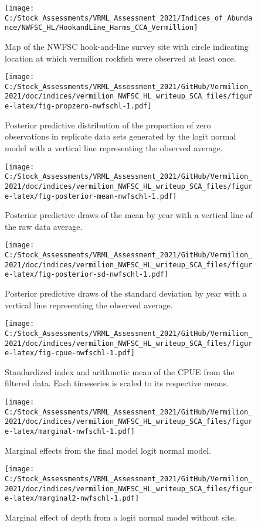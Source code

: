 \documentclass[
]{article}
\begin{document}
\FloatBarrier

\begin{figure}
\texttt{[image: C:/Stock\_Assessments/VRML\_Assessment\_2021/Indices\_of\_Abundance/NWFSC\_HL/HookandLine\_Harms\_CCA\_Vermillion]} \caption{Map of the NWFSC hook-and-line survey site with circle indicating location at which vermilion rockfish were observed at least once.}\label{fig:spp-sites}
\end{figure}

\begin{figure}
\centering
\texttt{[image: C:/Stock\_Assessments/VRML\_Assessment\_2021/GitHub/Vermilion\_2021/doc/indices/vermilion\_NWFSC\_HL\_writeup\_SCA\_files/figure-latex/fig-propzero-nwfschl-1.pdf]}
\caption{\label{fig:fig-propzero-nwfschl}Posterior predictive distribution of the proportion of zero observations in replicate data sets generated by the logit normal model with a vertical line representing the observed average.}
\end{figure}

\begin{figure}
\centering
\texttt{[image: C:/Stock\_Assessments/VRML\_Assessment\_2021/GitHub/Vermilion\_2021/doc/indices/vermilion\_NWFSC\_HL\_writeup\_SCA\_files/figure-latex/fig-posterior-mean-nwfschl-1.pdf]}
\caption{\label{fig:fig-posterior-mean-nwfschl}Posterior predictive draws of the mean by year with a vertical line of the raw data average.}
\end{figure}

\begin{figure}
\centering
\texttt{[image: C:/Stock\_Assessments/VRML\_Assessment\_2021/GitHub/Vermilion\_2021/doc/indices/vermilion\_NWFSC\_HL\_writeup\_SCA\_files/figure-latex/fig-posterior-sd-nwfschl-1.pdf]}
\caption{\label{fig:fig-posterior-sd-nwfschl}Posterior predictive draws of the standard deviation by year with a vertical line representing the observed average.}
\end{figure}

\begin{figure}
\centering
\texttt{[image: C:/Stock\_Assessments/VRML\_Assessment\_2021/GitHub/Vermilion\_2021/doc/indices/vermilion\_NWFSC\_HL\_writeup\_SCA\_files/figure-latex/fig-cpue-nwfschl-1.pdf]}
\caption{\label{fig:fig-cpue-nwfschl}Standardized index and arithmetic mean of the CPUE from the filtered data. Each timeseries is scaled to its respective means.}
\end{figure}

\begin{figure}
\centering
\texttt{[image: C:/Stock\_Assessments/VRML\_Assessment\_2021/GitHub/Vermilion\_2021/doc/indices/vermilion\_NWFSC\_HL\_writeup\_SCA\_files/figure-latex/marginal-nwfschl-1.pdf]}
\caption{\label{fig:marginal-nwfschl}Marginal effects from the final model logit normal model.}
\end{figure}

\begin{figure}
\centering
\texttt{[image: C:/Stock\_Assessments/VRML\_Assessment\_2021/GitHub/Vermilion\_2021/doc/indices/vermilion\_NWFSC\_HL\_writeup\_SCA\_files/figure-latex/marginal2-nwfschl-1.pdf]}
\caption{\label{fig:marginal2-nwfschl}Marginal effect of depth from a logit normal model without site.}
\end{figure}
\end{document}
